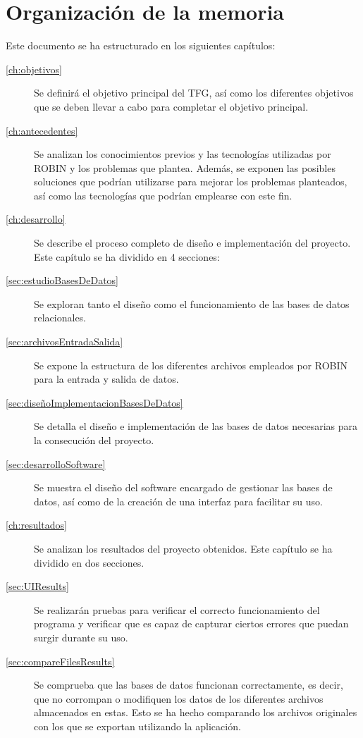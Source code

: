 \section{Organización de la memoria} 
\label{sec:organizacion-memoria}

Este documento se ha estructurado en los siguientes capítulos:
\begin{description}
    \item[\autoref{ch:objetivos}] Se definirá el objetivo principal del \acrshort{TFG}, así como los diferentes objetivos que se deben llevar a cabo para completar el objetivo principal.
    \item[\autoref{ch:antecedentes}] Se analizan los conocimientos previos y las tecnologías utilizadas por \acrshort{ROBIN} y los problemas que plantea. Además, se exponen las posibles soluciones que podrían utilizarse para mejorar los problemas planteados, así como las tecnologías que podrían emplearse con este fin.
    \item[\autoref{ch:desarrollo}] Se describe el proceso completo de diseño e implementación del proyecto. Este capítulo se ha dividido en 4 secciones:
    \item[\autoref{sec:estudioBasesDeDatos}] Se exploran tanto el diseño como el funcionamiento de las bases de datos relacionales. 
    \item[\autoref{sec:archivosEntradaSalida}] Se expone la estructura de los diferentes archivos empleados por \acrshort{ROBIN} para la entrada y salida de datos.
    \item[\autoref{sec:diseñoImplementacionBasesDeDatos}] Se detalla el diseño e implementación de las bases de datos necesarias para la consecución del proyecto.
    \item[\autoref{sec:desarrolloSoftware}] Se muestra el diseño del software encargado de gestionar las bases de datos, así como de la creación de una interfaz para facilitar su uso.
    \item[\autoref{ch:resultados}] Se analizan los resultados del proyecto obtenidos. Este capítulo se ha dividido en dos secciones.
    \item[\autoref{sec:UIResults}] Se realizarán pruebas para verificar el correcto funcionamiento del programa y verificar que es capaz de capturar ciertos errores que puedan surgir durante su uso.
    \item[\autoref{sec:compareFilesResults}] Se comprueba que las bases de datos funcionan correctamente, es decir, que no corrompan o modifiquen los datos de los diferentes archivos almacenados en estas. Esto se ha hecho comparando los archivos originales con los que se exportan utilizando la aplicación.    

\end{description}
